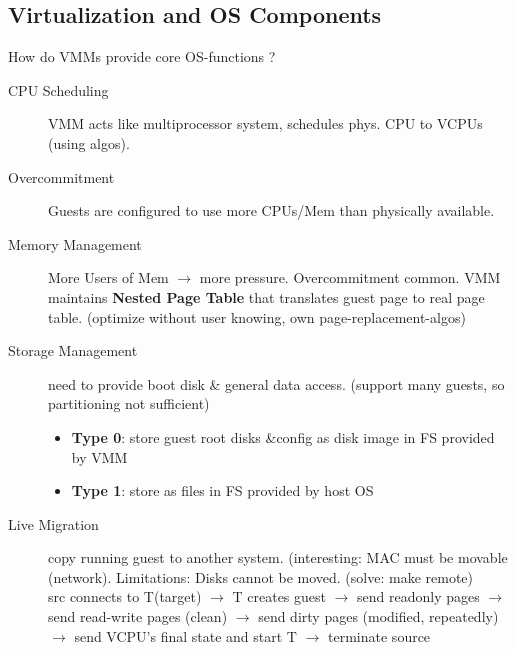 \subsection*{Virtualization and OS Components}
How do VMMs provide core OS-functions ?
\begin{description}
    \item[CPU Scheduling]VMM acts like multiprocessor system, schedules phys. CPU to VCPUs (using algos). %
    \item[Overcommitment]Guests are configured to use more CPUs/Mem than physically available.
    \item[Memory Management] More Users of Mem $\rightarrow$ more pressure. Overcommitment common. VMM maintains \textbf{Nested Page Table} that translates guest page to real page table. (optimize without user knowing, own page-replacement-algos)
    \item[Storage Management] need to provide boot disk \& general data access. (support many guests, so partitioning not sufficient)
        \begin{itemize}[label={}, labelsep=0pt]
            \item \textbf{Type 0}: store guest root disks \&config as disk image in FS provided by VMM
            \item \textbf{Type 1}: store as files in FS provided by host OS %
        \end{itemize}
    \item[Live Migration]copy running guest to another system. (interesting: MAC must be movable (network). Limitations: Disks cannot be moved. (solve: make remote) \\
    src connects to T(target) $\rightarrow$ T creates guest $\rightarrow$ send readonly pages $\rightarrow$ send read-write pages (clean) $\rightarrow$ send dirty pages (modified, repeatedly) $\rightarrow$ send VCPU's final state and start T $\rightarrow$ terminate source
\end{description}


